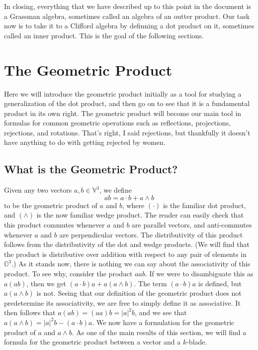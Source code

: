 \documentclass{article}
\newcommand{\V}{\mathbb{V}}
\newcommand{\G}{\mathbb{G}}
\begin{document}
In closing, everything that we have described up to this point in the document is a Grassman
algebra, sometimes called an algebra of an outter product.  Our task now
is to take it to a Clifford algebra by definning a dot product on it,
sometimes called an inner product.  This is the goal of the following sections.

\section{The Geometric Product}

Here we will introduce the geometric product initially as a tool for studying
a generalization of the dot product, and then go on to see that it is a fundamental
product in its own right.  The geometric product will become our main tool in formulas
for common geometric operations such as reflections, projections, rejections,
and rotations.  That's right, I said rejections, but thankfully it doesn't have anything
to do with getting rejected by women.

\subsection{What is the Geometric Product?}

Given any two vectors $a,b\in\V^3$, we define
\begin{equation}\label{gp_def}
ab = a\cdot b+a\wedge b
\end{equation}
to be the geometric product of $a$ and $b$, where $(\cdot)$ is
the familiar dot product, and $(\wedge)$ is the now familiar wedge
product.  The reader can
easily check that this product commutes whenever $a$ and $b$
are parallel vectors, and anti-commutes whenever $a$ and $b$
are perpendicular vectors.  The distributivity of this product
follows from the distributivity of the dot and wedge
products.  (We will find that the product is distributive
over addition with respect to any pair of elements in $\G^3$.)
As it stands now, there is nothing we can say about
the associativity of this product.  To see why, consider
the product $aab$.  If we were to disambiguate this as
$a(ab)$, then we get $(a\cdot b)a+a(a\wedge b)$.
The term $(a\cdot b)a$ is defined, but $a(a\wedge b)$ is not.
Seeing that our definition of the geometric product does not
predetermine its associativity, we are free to simply define it as
associative.  It then follows that $a(ab)=(aa)b=|a|^2 b$,
and we see that $a(a\wedge b)=|a|^2 b - (a\cdot b)a$.
We now have a formulation for the geometric product of $a$
and $a\wedge b$.  As one of the main results of this section,
we will find a formula for the geometric product between a
vector and a $k$-blade.
\end{document}
